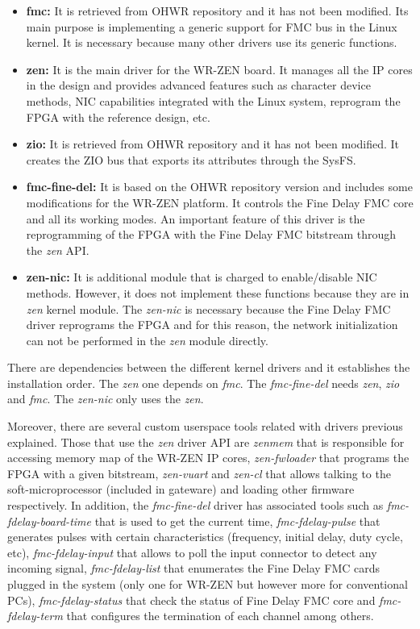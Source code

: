 \documentclass[review]{elsarticle}
\begin{document}
\begin{itemize}
	\item {\textbf{fmc:} It is retrieved from OHWR repository and it has not been modified. Its main purpose is implementing a generic support for FMC bus in the Linux kernel. It is necessary because many other drivers use its generic functions.}
	\item {\textbf{zen:} It is the main driver for the WR-ZEN board. It manages all the IP cores in the design and provides advanced features such as character device methods, NIC capabilities integrated with the Linux system, reprogram the FPGA with the reference design, etc.}
	\item{\textbf{zio:} It is retrieved from OHWR repository and it has not been modified. It creates the ZIO bus that exports its attributes through the SysFS.}
	\item{\textbf{fmc-fine-del:} It is based on the OHWR repository version and includes some modifications for the WR-ZEN platform. It controls the Fine Delay FMC core and all its working modes. An important feature of this driver is the reprogramming of the FPGA with the Fine Delay FMC bitstream through the \textit{zen} API.}
	\item {\textbf{zen-nic:} It is additional module that is charged to enable/disable NIC methods. However, it does not implement these functions because they are in \textit{zen} kernel module. The \textit{zen-nic} is necessary because the Fine Delay FMC driver reprograms the FPGA and for this reason, the network initialization can not be performed in the \textit{zen} module directly.}
\end{itemize}

There are dependencies between the different kernel drivers and it establishes the installation order. The \textit{zen} one depends on \textit{fmc}. The \textit{fmc-fine-del} needs \textit{zen}, \textit{zio} and \textit{fmc}. The \textit{zen-nic} only uses the \textit{zen}.

Moreover, there are several custom userspace tools related with drivers previous explained. Those that use the \textit{zen} driver API are \textit{zenmem} that is responsible for accessing memory map of the WR-ZEN IP cores, \textit{zen-fwloader} that programs the FPGA with a given bitstream, \textit{zen-vuart} and \textit{zen-cl} that allows talking to the soft-microprocessor (included in gateware) and loading other firmware respectively. In addition, the  \textit{fmc-fine-del} driver has associated tools such as \textit{fmc-fdelay-board-time} that is used to get the current time, \textit{fmc-fdelay-pulse} that generates pulses with certain characteristics (frequency, initial delay, duty cycle, etc), \textit{fmc-fdelay-input} that allows to poll the input connector to detect any incoming signal, \textit{fmc-fdelay-list} that enumerates the Fine Delay FMC cards plugged in the system (only one for WR-ZEN but however more for conventional PCs), \textit{fmc-fdelay-status} that check the status of Fine Delay FMC core and \textit{fmc-fdelay-term} that configures the termination of each channel among others.
\end{document}
